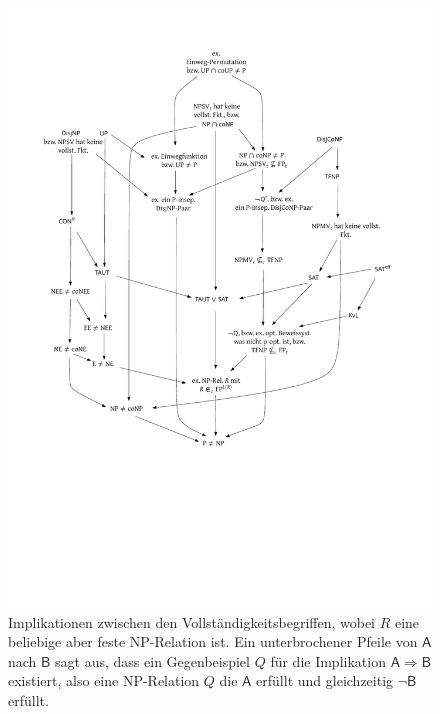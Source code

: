 \begin{figure}
    \centering\includegraphics[page=2]{figures.pdf}
    \caption{Implikationen zwischen den  Vollständigkeitsbegriffen, wobei $R$ eine beliebige aber feste NP-Relation ist. Ein unterbrochener Pfeile von $\mathsf{A}$ nach $\mathsf{B}$ sagt aus, dass ein Gegenbeispiel $Q$ für die Implikation $\mathsf{A\Rightarrow B}$ existiert, also eine NP-Relation $Q$ die $\mathsf{A}$ erfüllt und gleichzeitig $\neg\mathsf{B}$ erfüllt.}\label{fig:reduktionsbegriffe}
    \forceversofloat
\end{figure}



